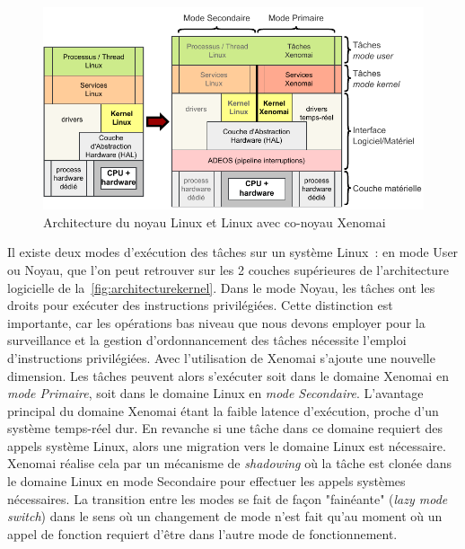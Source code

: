 \documentclass[french, a4paper, 11pt, twoside, pdftex]{StyleThese}
\begin{document}
	\begin{figure}[ht]
		\centering
		\includegraphics[width=\linewidth]{schemas/Architecture_kernel}
		\caption[Architecture co-noyau Linux et Xenomai]{Architecture du noyau Linux et Linux avec co-noyau Xenomai}
		\label{fig:architecturekernel}
	\end{figure}
	
		Il existe deux modes d'exécution des tâches sur un système Linux~:  en mode User ou Noyau, que l'on peut retrouver sur les 2 couches supérieures de l'architecture logicielle de la~\autoref{fig:architecturekernel}. Dans le mode Noyau, les tâches ont les droits pour exécuter des instructions privilégiées. Cette distinction est importante, car les opérations bas niveau que nous devons employer pour la surveillance et la gestion d'ordonnancement des tâches nécessite l'emploi d'instructions privilégiées. Avec l'utilisation de Xenomai s'ajoute une nouvelle dimension. Les tâches peuvent alors s'exécuter soit dans le domaine Xenomai en \textit{mode Primaire}, soit dans le domaine Linux en \textit{mode Secondaire}. L'avantage principal du domaine Xenomai étant la faible latence d'exécution, proche d'un système temps-réel dur. En revanche si une tâche dans ce domaine requiert des appels système Linux, alors une migration vers le domaine Linux est nécessaire. Xenomai réalise cela par un mécanisme de \textit{shadowing} où la tâche est clonée dans le domaine Linux en mode Secondaire pour effectuer les appels systèmes nécessaires. La transition entre les modes se fait de façon "fainéante" (\textit{lazy mode switch}) dans le sens où un changement de mode n'est fait qu'au moment où un appel de fonction requiert d'être dans l'autre mode de fonctionnement.
		
\end{document}
